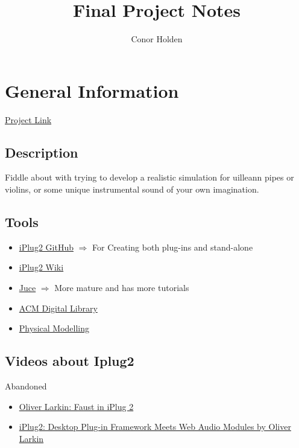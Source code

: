 \documentclass{article}
\title{Final Project Notes}
\author{Conor Holden }
\begin{document}
\maketitle

\tableofcontents

\section{General Information}

	\href{http://project.cs.ucc.ie/project/567}{Project Link}
	
	\subsection{Description}
		Fiddle about with trying to develop a realistic simulation for uilleann pipes or violins, 
		or some unique instrumental sound of your own imagination.
		
	\subsection{Tools}
		\begin{itemize}
			\item \href{https://github.com/iPlug2/iPlug2}{iPlug2 GitHub} $\Rightarrow$ For Creating both plug-ins and stand-alone
			\item \href{https://github.com/iPlug2/iPlug2/wiki}{iPlug2 Wiki}
			\item \href{https://juce.com/}{Juce}  $\Rightarrow$ More mature and has more tutorials
			\item \href{https://dl.acm.org/}{ACM Digital Library}
			\item \href{https://www.youtube.com/watch?v=sxt5rxF_PdI&feature=emb_logo}{Physical Modelling}
		\end{itemize}
	
	\subsection{Videos about Iplug2 }
		Abandoned
		\begin{itemize}
			\item \href{https://www.youtube.com/watch?v=SLHGxBYeID4\&feature=youtu.be}{Oliver Larkin: Faust in iPlug 2}
			\item \href{https://www.youtube.com/watch?v=DDrgW4Qyz8Y\&feature=youtu.be}{iPlug2: Desktop Plug-in Framework Meets Web Audio Modules by Oliver Larkin}
		\end{itemize}
	 
\end{document}
